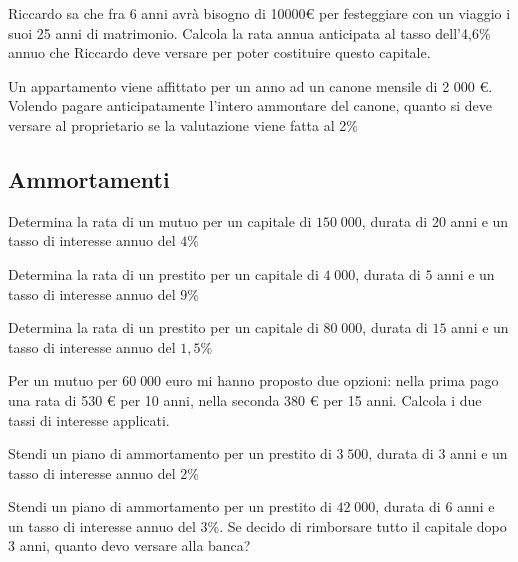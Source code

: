 \begin{esercizio}
Riccardo sa che fra 6 anni avrà bisogno di 10000€ per festeggiare con un 
viaggio i suoi 25 anni di matrimonio. Calcola la rata annua anticipata al 
tasso dell'4,6\% annuo che Riccardo deve versare per poter costituire 
questo capitale.
\end{esercizio}
\begin{esercizio}
Un appartamento viene affittato per un anno ad un canone mensile di 2 000 
€. Volendo pagare anticipatamente l'intero ammontare del canone, quanto si 
deve versare al proprietario se la valutazione viene fatta al 2\%
\end{esercizio}


\subsection{Ammortamenti}
\begin{esercizio}
Determina la rata di un mutuo per un capitale di \(150\;000\), 
durata di \(20\) anni e un tasso di interesse annuo del \(4\%\)
\end{esercizio}
\begin{esercizio}
Determina la rata di un prestito per un capitale di \(4\;000\), 
durata di \(5\) anni e un tasso di interesse annuo del \(9\%\)
\end{esercizio}
\begin{esercizio}
Determina la rata di un prestito per un capitale di \(80\;000\), 
durata di \(15\) anni e un tasso di interesse annuo del \(1,5\%\)
\end{esercizio}
\begin{esercizio}
Per un mutuo per \(60\;000\) euro mi hanno proposto due opzioni: nella prima 
pago una rata di 530 € per 10 anni, nella seconda 380 € per 15 anni. 
Calcola i due tassi di interesse applicati.
\end{esercizio}


\begin{esercizio}
Stendi un piano di ammortamento per un prestito di \(3\;500\), durata di \(3\) 
anni e un tasso di interesse annuo del \(2\%\)
\end{esercizio}
\begin{esercizio}
Stendi un piano di ammortamento per un prestito di \(42\;000\), durata di \(6\) 
anni e un tasso di interesse annuo del \(3\%\). Se decido di rimborsare tutto 
il capitale dopo 3 anni, quanto devo versare alla banca?
\end{esercizio}
